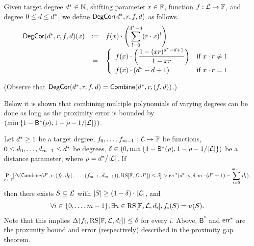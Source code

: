 \begin{definition}\label{def:deg_corr}
\leanok
{}
    Given target degree $d^*\in\mathbb{N}$, shifting parameter $r\in\mathbb{F}$, function $f:\mathcal{L}\rightarrow\mathbb{F}$, and degree $0\leq d\leq d^*$, we define $\mathsf{DegCor}(d^*,r,f,d)$ as follows.
    \[
    \begin{array}{rcl}
    \mathsf{DegCor}(d^*, r, f, d)(x)
    & := & \displaystyle f(x) \cdot \left( \sum_{l=0}^{d^* - d} (r \cdot x)^l \right) \\[10pt]
    & = & \left\{
    \begin{array}{ll}
        \displaystyle f(x) \cdot \left( \dfrac{1 - (x r)^{d^* - d + 1}}{1 - x r} \right)
        & \text{if } x \cdot r \neq 1 \\[8pt]
        \displaystyle f(x) \cdot (d^* - d + 1)
        & \text{if } x \cdot r = 1
    \end{array}
    \right.
    \end{array}
    \]


(Observe that $\mathsf{DegCor}(d^*,r,f,d)=\mathsf{Combine}(d^*,r,(f,d))$.)
\end{definition}

Below it is shown that combining multiple polynomials of varying degrees can be done as long as the proximity error is bounded by $(\min{\{1-{\mathsf{B}}^*(\rho),1-\rho-1/|\mathcal{L}|\}})$.

\begin{lemma}\label{lemma:combine}
\leanok
{}
    Let $d^*\ge1$ be a target degree, $f_0,\ldots,f_{m-1}:\mathcal{L}\rightarrow\mathbb{F}$ be functions, $0\leq d_0,\ldots,d_{m-1}\leq d^*$ be degrees, $\delta\in(0,\min{\{1-{\mathsf{B}}^*(\rho),1-\rho-1/|\mathcal{L}|\}})$ be a distance parameter, where $\rho=d^*/|\mathcal{L}|$. If
    \[
        \Pr_{r\gets\mathbb{F}}[\Delta(\mathsf{Combine}(d^*,r,(f_0,d_0),\ldots,(f_{m-1},d_{m-1})),\mathrm{RS}[\mathbb{F},\mathcal{L},d^*])\le\delta]>\mathsf{err}^*(d^*,\rho,\delta,m\cdot(d^*+1)-\sum_{i=0}^{m-1}d_i),
    \]
    then there exists $S\subseteq \mathcal{L}$ with $|S|\geq(1-\delta)\cdot|\mathcal{L}|$, and
    \[
        \forall i\in\{0,\ldots,m-1\},\exists u\in\mathrm{RS}[\mathbb{F},\mathcal{L},d_i], f_i(S)=u(S).
    \]
    Note that this implies $\Delta(f_i,\mathrm{RS}[\mathbb{F},\mathcal{L},d_i])\le\delta$ for every $i$. Above, ${\mathsf{B}}^*$ and ${\mathsf{err}}^*$ are the proximity bound and error (respectively) described in the proximity gap theorem.
\end{lemma}

